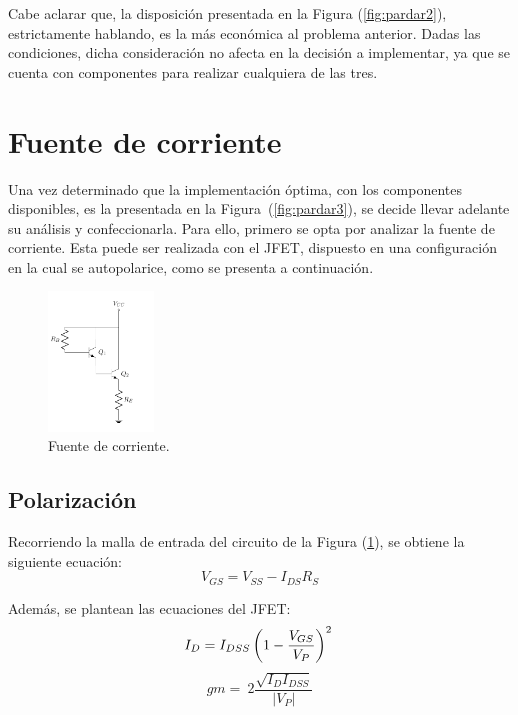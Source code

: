 Cabe aclarar que, la disposición presentada en la Figura (\ref{fig:pardar2}), estrictamente hablando, es la más económica al problema anterior. Dadas las condiciones, dicha consideración no afecta en la decisión a implementar, ya que se cuenta con componentes para realizar cualquiera de las tres.

\section{Fuente de corriente}
\label{sec:fdei}
Una vez determinado que la implementación óptima, con los componentes disponibles, es la presentada en la Figura~(\ref{fig:pardar3}), se decide llevar adelante su análisis y confeccionarla. Para ello, primero se opta por analizar la fuente de corriente. Esta puede ser realizada con el JFET, dispuesto en una configuración en la cual se autopolarice, como se presenta a continuación.
\begin{figure}[H]
\centering
	\includegraphics[width=0.25\textwidth, page=4]{Imagenes/ParDarlington.pdf}
	\caption{Fuente de corriente.}
	\label{fig:fuentei}
\end{figure}

\subsection{Polarización}
Recorriendo la malla de entrada del circuito de la Figura (\ref{fig:fuentei}), se obtiene la siguiente ecuación:
\begin{equation*}
	V_{GS} = V_{SS} - I_{DS} R_{S}
\end{equation*}

Además, se plantean las ecuaciones del JFET:
\begin{equation*}
	I_{D} = I_{DSS} \left( 1 - \frac{V_{GS}}{V_P} \right)^2 \\
\end{equation*}
\begin{equation*}
	gm = \ 2\frac{\sqrt{I_{D} I_{DSS}}}{|V_P|}
\end{equation*}

